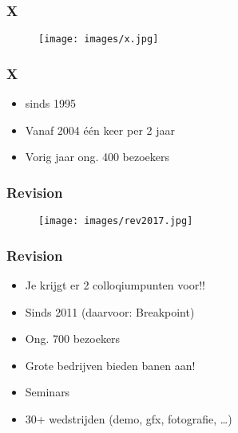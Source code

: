 \documentclass[aspectratio=43]{uva-inf-presentation}
\begin{document}

\begin{frame}
\frametitle{X}

\begin{figure}
\texttt{[image: images/x.jpg]}
\end{figure}

\end{frame}


\begin{frame}
\frametitle{X}

\begin{itemize}
\item sinds 1995
\item Vanaf 2004 \'e\'en keer per 2 jaar
\item Vorig jaar ong. 400 bezoekers
\end{itemize}

\end{frame}


\begin{frame}
\frametitle{Revision}

\begin{figure}
\texttt{[image: images/rev2017.jpg]}
\end{figure}

\end{frame}


\begin{frame}
\frametitle{Revision}

\begin{itemize}
\item Je krijgt er 2 colloqiumpunten voor!!
\item Sinds 2011 (daarvoor: Breakpoint)
\item Ong. 700 bezoekers
\item Grote bedrijven bieden banen aan!
\item Seminars
\item 30+ wedstrijden (demo, gfx, fotografie, \dots)
\end{itemize}
\end{frame}

\end{document}
